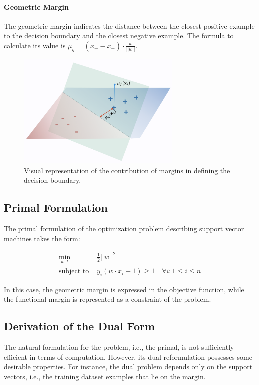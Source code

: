 \paragraph{Geometric Margin} The geometric margin indicates the distance between the closest positive example to the decision boundary and the closest negative example. The formula to calculate its value is $\mu_g=(x_+-x_-)\cdot\frac{w}{||w||}$.

\begin{figure}[H]
    \centering
    \includegraphics[width=0.7\textwidth]{figures/margins}
    \caption{Visual representation of the contribution of margins in defining the decision boundary.}
    \label{svm-margins}
\end{figure}

\subsection{Primal Formulation}

The primal formulation of the optimization problem describing support vector machines takes the form:

\begin{align*}
    \min_{w, t}\ & \frac{1}{2}||w||^2 \\
    \text{subject to } & y_i(w \cdot x_i - 1)\geq 1 \quad \forall i:1\leq i\leq n
\end{align*}

In this case, the geometric margin is expressed in the objective function, while the functional margin is represented as a constraint of the problem.

\subsection{Derivation of the Dual Form}

The natural formulation for the problem, i.e., the primal, is not sufficiently efficient in terms of computation. However, its dual reformulation possesses some desirable properties. For instance, the dual problem depends only on the support vectors, i.e., the training dataset examples that lie on the margin.

